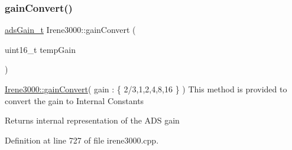\subsubsection{\texorpdfstring{gain\+Convert()}{gainConvert()}}
{\footnotesize\ttfamily \hyperlink{_cool_adafruit___a_d_s1015_8h_a3d6c0e15829a207b9155890811fa4781}{ads\+Gain\+\_\+t} Irene3000\+::gain\+Convert (\begin{DoxyParamCaption}\item[{uint16\+\_\+t}]{temp\+Gain }\end{DoxyParamCaption})}

\hyperlink{class_irene3000_abcad62d1201a59f8dd3ba87048002728}{Irene3000\+::gain\+Convert}( gain \+: \{ 2/3,1,2,4,8,16 \} ) This method is provided to convert the gain to Internal Constants

\begin{DoxyReturn}{Returns}
internal representation of the A\+DS gain 
\end{DoxyReturn}


Definition at line 727 of file irene3000.\+cpp.


